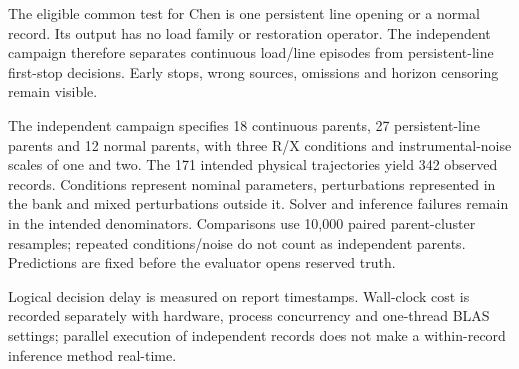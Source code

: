 The eligible common test for Chen is one persistent line opening or a normal record. Its output has no load family or restoration operator. The independent campaign therefore separates continuous load/line episodes from persistent-line first-stop decisions. Early stops, wrong sources, omissions and horizon censoring remain visible.

The independent campaign specifies 18 continuous parents, 27 persistent-line parents and 12 normal parents, with three R/X conditions and instrumental-noise scales of one and two. The 171 intended physical trajectories yield 342 observed records. Conditions represent nominal parameters, perturbations represented in the bank and mixed perturbations outside it. Solver and inference failures remain in the intended denominators. Comparisons use 10,000 paired parent-cluster resamples; repeated conditions/noise do not count as independent parents. Predictions are fixed before the evaluator opens reserved truth.

Logical decision delay is measured on report timestamps. Wall-clock cost is recorded separately with hardware, process concurrency and one-thread BLAS settings; parallel execution of independent records does not make a within-record inference method real-time.
